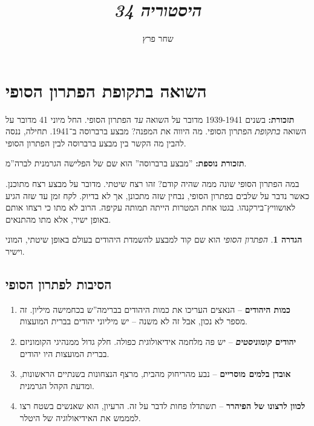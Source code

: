 \documentclass[]{article}
\author{שחר פרץ}
\title{\textit{היסטוריה 34}}
\theoremstyle{definition}
\newtheorem{definition}{הגדרה}
\newcommand\defi  [1] {\begin{definition}#1\end{definition}}
\begin{document}
	\maketitle
	\section{השואה בתקופת הפתרון הסופי}
	\textbf{תזכורת: }בשנים 1939-1941 מדובר על השואה \textit{עד} הפתרון הסופי. החל מיוני 41 מדובר על השואה \textit{בתקופת} הפתרון הסופי. מה היווה את המפנה? מבצע ברברוסה ב־1941. תחילה, ננסה להבין מה הקשר בין מבצע ברברוסה לבין הפתרון הסופי. 
	
	\textbf{תזכורת נוספת: }''מבצע ברברוסה'' הוא שם של הפלישה הגרמנית לברה''מ. 
	
	במה הפתרון הסופי שונה ממה שהיה קודם? זהו רצח שיטתי. מדובר על מבצע רצח מתוכנן. כאשר נדבר על שלבים בפתרון הסופי, נבחין שזה מתכונן, אך לא בדיוק. לקח זמן עד שזה הגיע לאושוויץ־בירקנהו. בגטו אחת המטרות הייתה תמותה עקיפה. הרוב לא מתו כי רצחו אותם באופן ישיר, אלא מתו מהתנאים. 
	
	\defi{\textit{הפתרון הסופי} הוא שם קוד למבצע להשמדת היהודים בעולם באופן שיטתי, המוני וישיר. }
	
	\subsection{הסיבות לפתרון הסופי}
	\begin{enumerate}
		\item \textbf{כמות היהודים} – הנאצים העריכו את כמות היהודים בברימה''ש בכחמישה מיליון. זה מספר לא נכון, אבל זה לא משנה – יש מיליוני יהודים בברית המועצות. 
		\item \textbf{יהודים \textit{קומוניסטים}} – יש פה מלחמה אידיאולוגית כפולה. חלק גדול ממנהיגי הקומוניזם בברית המועצות היו יהודים. 
		\item \textbf{אובדן בלמים מוסריים} – נבע מהריחוק מהבית, מרצף הנצחונות בשנתיים הראשונות, ומדעת הקהל הגרמנית. 
		\item \textbf{לכוון לרצונו של הפיהרר} – תשתדלו פחות לדבר על זה. הרעיון, הוא שאנשים בשטח רצו למממש את האידיאולוגיה של היטלר. 
	\end{enumerate}
	
\end{document}
